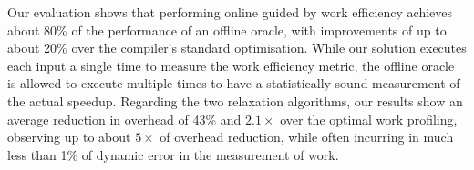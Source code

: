 Our evaluation shows that performing online {\itercomp} guided by work efficiency
achieves about 80\% of the performance of an offline oracle, with improvements
of up to about 20\% over the compiler's standard optimisation.
While our solution executes each input a single time to measure the work
efficiency metric, the offline oracle is allowed to execute multiple times to
have a statistically sound measurement of the actual speedup.
Regarding the two relaxation algorithms, our results show an average reduction
in overhead of 43\% and $2.1\times$ over the optimal work profiling, observing
up to about $5\times$ of overhead reduction, while often incurring in much less
than 1\% of dynamic error in the measurement of work.



